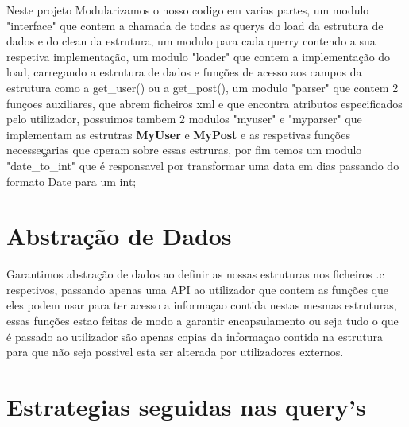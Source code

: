 \documentclass[a4paper,10pt]{article}
\begin{document}
    \quad Neste projeto Modularizamos o nosso codigo em varias partes, um modulo "interface" que contem a chamada de todas as querys do load da estrutura de dados e do clean da estrutura, um modulo para cada querry contendo a sua respetiva implementa\c{c}\~{a}o, um modulo "loader" que contem a implementa\c{c}\~{a}o do load, carregando a estrutura de dados e funções de acesso aos campos da estrutura como a get\_user() ou a get\_post(), um modulo "parser" que contem 2 funçoes auxiliares, que abrem ficheiros xml e que encontra atributos especificados pelo utilizador, possuimos tambem 2 modulos "myuser" e "myparser" que implementam as estrutras \textbf{MyUser} e \textbf{MyPost} e as respetivas funções necesse\c{ç}arias que operam sobre essas estruras, por fim temos um modulo "date\_to\_int" que \'e responsavel por transformar uma data em dias passando do formato Date para um int;


    \section {Abstra\c{c}\~{a}o de Dados}

    \quad Garantimos abstra\c{c}\~{a}o de dados ao definir as nossas estruturas nos ficheiros .c respetivos, passando apenas uma API ao utilizador que contem as fun\c{c}\~{o}es que eles podem usar para ter acesso a informaçao contida nestas mesmas estruturas, essas fun\c{c}\~{o}es estao feitas de modo a garantir encapsulamento ou seja tudo o que é passado ao utilizador s\~ao apenas copias da informa\c{c}ao contida na estrutura para que n\~ao seja possivel esta ser alterada por utilizadores externos.
  

  \section {Estrategias seguidas nas query's}
    
\end{document}

